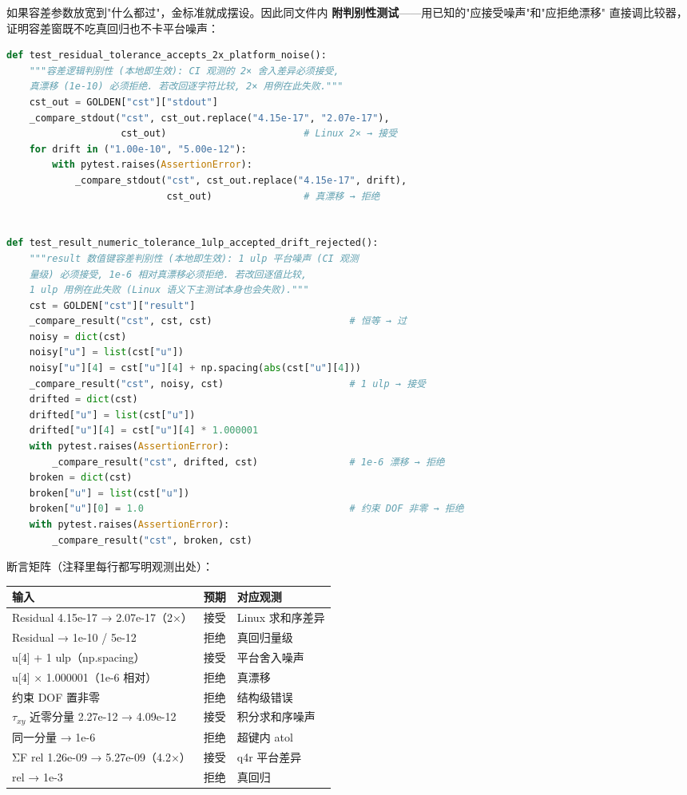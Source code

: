 \documentclass[12pt,a4paper]{ctexart}
\begin{document}
如果容差参数放宽到"什么都过"，金标准就成摆设。因此同文件内
\textbf{附判别性测试}——用已知的"应接受噪声"和"应拒绝漂移"
直接调比较器，证明容差窗既不吃真回归也不卡平台噪声：

\begin{lstlisting}[language=python]
def test_residual_tolerance_accepts_2x_platform_noise():
    """容差逻辑判别性 (本地即生效): CI 观测的 2× 舍入差异必须接受,
    真漂移 (1e-10) 必须拒绝. 若改回逐字符比较, 2× 用例在此失败."""
    cst_out = GOLDEN["cst"]["stdout"]
    _compare_stdout("cst", cst_out.replace("4.15e-17", "2.07e-17"),
                    cst_out)                        # Linux 2× → 接受
    for drift in ("1.00e-10", "5.00e-12"):
        with pytest.raises(AssertionError):
            _compare_stdout("cst", cst_out.replace("4.15e-17", drift),
                            cst_out)                # 真漂移 → 拒绝


def test_result_numeric_tolerance_1ulp_accepted_drift_rejected():
    """result 数值键容差判别性 (本地即生效): 1 ulp 平台噪声 (CI 观测
    量级) 必须接受, 1e-6 相对真漂移必须拒绝. 若改回逐值比较,
    1 ulp 用例在此失败 (Linux 语义下主测试本身也会失败)."""
    cst = GOLDEN["cst"]["result"]
    _compare_result("cst", cst, cst)                        # 恒等 → 过
    noisy = dict(cst)
    noisy["u"] = list(cst["u"])
    noisy["u"][4] = cst["u"][4] + np.spacing(abs(cst["u"][4]))
    _compare_result("cst", noisy, cst)                      # 1 ulp → 接受
    drifted = dict(cst)
    drifted["u"] = list(cst["u"])
    drifted["u"][4] = cst["u"][4] * 1.000001
    with pytest.raises(AssertionError):
        _compare_result("cst", drifted, cst)                # 1e-6 漂移 → 拒绝
    broken = dict(cst)
    broken["u"] = list(cst["u"])
    broken["u"][0] = 1.0                                    # 约束 DOF 非零 → 拒绝
    with pytest.raises(AssertionError):
        _compare_result("cst", broken, cst)
\end{lstlisting}

断言矩阵（注释里每行都写明观测出处）：

\begin{table}[h]
\centering
\small
\begin{tabular}{p{6.4cm}p{3.4cm}p{4.2cm}}
\toprule
\textbf{输入} & \textbf{预期} & \textbf{对应观测} \\
\midrule
Residual 4.15e-17 → 2.07e-17（2×） & 接受 & Linux 求和序差异 \\
Residual → 1e-10 / 5e-12 & 拒绝 & 真回归量级 \\
u[4] + 1 ulp（np.spacing） & 接受 & 平台舍入噪声 \\
u[4] × 1.000001（1e-6 相对） & 拒绝 & 真漂移 \\
约束 DOF 置非零 & 拒绝 & 结构级错误 \\
$\tau_{xy}$ 近零分量 2.27e-12 → 4.09e-12 & 接受 & 积分求和序噪声 \\
同一分量 → 1e-6 & 拒绝 & 超键内 atol \\
ΣF rel 1.26e-09 → 5.27e-09（4.2×） & 接受 & q4r 平台差异 \\
rel → 1e-3 & 拒绝 & 真回归 \\
\bottomrule
\end{tabular}
\end{table}
\end{document}
